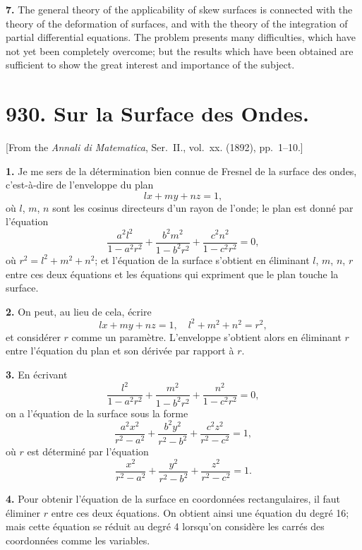 \documentclass[11pt,a4paper]{book}
\begin{document}
\textbf{7.} The general theory of the applicability of skew surfaces is connected
with the theory of the deformation of surfaces, and with the theory of the
integration of partial differential equations. The problem presents many difficulties,
which have not yet been completely overcome; but the results which have been
obtained are sufficient to show the great interest and importance of the subject.



\newpage
\section*{930. Sur la Surface des Ondes.}

[From the \textit{Annali di Matematica}, Ser.~II., vol.~xx. (1892), pp.~1--10.]

\bigskip

\textbf{1.} Je me sers de la d\'etermination bien connue de Fresnel de la surface
des ondes, c'est-\`a-dire de l'enveloppe du plan
\[
lx + my + nz = 1,
\]
o\`u $l$, $m$, $n$ sont les cosinus directeurs d'un rayon de l'onde; le plan est donn\'e par
l'\'equation
\[
\frac{a^2l^2}{1-a^2r^2} + \frac{b^2m^2}{1-b^2r^2} + \frac{c^2n^2}{1-c^2r^2} = 0,
\]
o\`u $r^2 = l^2 + m^2 + n^2$; et l'\'equation de la surface s'obtient en \'eliminant $l$, $m$, $n$, $r$
entre ces deux \'equations et les \'equations qui expriment que le plan touche la surface.

\textbf{2.} On peut, au lieu de cela, \'ecrire
\[
lx + my + nz = 1, \quad l^2 + m^2 + n^2 = r^2,
\]
et consid\'erer $r$ comme un param\`etre. L'enveloppe s'obtient alors en \'eliminant
$r$ entre l'\'equation du plan et son d\'eriv\'ee par rapport \`a $r$.

\textbf{3.} En \'ecrivant
\[
\frac{l^2}{1-a^2r^2} + \frac{m^2}{1-b^2r^2} + \frac{n^2}{1-c^2r^2} = 0,
\]
on a l'\'equation de la surface sous la forme
\[
\frac{a^2x^2}{r^2-a^2} + \frac{b^2y^2}{r^2-b^2} + \frac{c^2z^2}{r^2-c^2} = 1,
\]
o\`u $r$ est d\'etermin\'e par l'\'equation
\[
\frac{x^2}{r^2-a^2} + \frac{y^2}{r^2-b^2} + \frac{z^2}{r^2-c^2} = 1.
\]

\textbf{4.} Pour obtenir l'\'equation de la surface en coordonn\'ees rectangulaires,
il faut \'eliminer $r$ entre ces deux \'equations. On obtient ainsi une \'equation du
degr\'e 16; mais cette \'equation se r\'eduit au degr\'e 4 lorsqu'on consid\`ere les
carr\'es des coordonn\'ees comme les variables.
\end{document}
